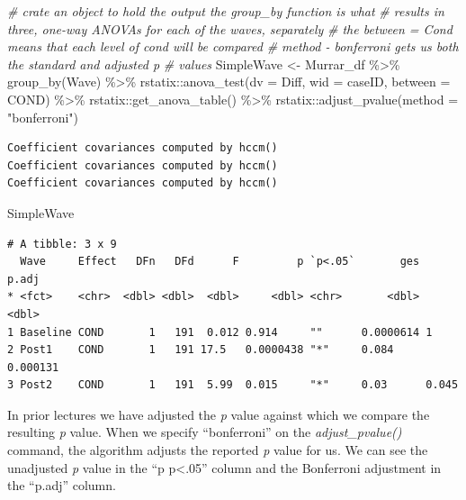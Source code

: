 \documentclass[
  11pt,
]{book}
\newenvironment{Shaded}{\begin{snugshade}}{\end{snugshade}}
\newcommand{\AttributeTok}[1]{\textcolor[rgb]{0.77,0.63,0.00}{#1}}
\newcommand{\CommentTok}[1]{\textcolor[rgb]{0.56,0.35,0.01}{\textit{#1}}}
\newcommand{\FunctionTok}[1]{\textcolor[rgb]{0.00,0.00,0.00}{#1}}
\newcommand{\NormalTok}[1]{#1}
\newcommand{\OtherTok}[1]{\textcolor[rgb]{0.56,0.35,0.01}{#1}}
\newcommand{\SpecialCharTok}[1]{\textcolor[rgb]{0.00,0.00,0.00}{#1}}
\newcommand{\StringTok}[1]{\textcolor[rgb]{0.31,0.60,0.02}{#1}}
\begin{document}
\begin{Shaded}
\begin{Highlighting}[]
\CommentTok{\# crate an object to hold the output the group\_by function is what}
\CommentTok{\# results in three, one{-}way ANOVAs for each of the waves, separately}
\CommentTok{\# the between = Cond means that each level of cond will be compared}
\CommentTok{\# method {-} \textquotesingle{}bonferroni\textquotesingle{} gets us both the standard and adjusted p}
\CommentTok{\# values}
\NormalTok{SimpleWave }\OtherTok{\textless{}{-}}\NormalTok{ Murrar\_df }\SpecialCharTok{\%\textgreater{}\%}
    \FunctionTok{group\_by}\NormalTok{(Wave) }\SpecialCharTok{\%\textgreater{}\%}
\NormalTok{    rstatix}\SpecialCharTok{::}\FunctionTok{anova\_test}\NormalTok{(}\AttributeTok{dv =}\NormalTok{ Diff, }\AttributeTok{wid =}\NormalTok{ caseID, }\AttributeTok{between =}\NormalTok{ COND) }\SpecialCharTok{\%\textgreater{}\%}
\NormalTok{    rstatix}\SpecialCharTok{::}\FunctionTok{get\_anova\_table}\NormalTok{() }\SpecialCharTok{\%\textgreater{}\%}
\NormalTok{    rstatix}\SpecialCharTok{::}\FunctionTok{adjust\_pvalue}\NormalTok{(}\AttributeTok{method =} \StringTok{"bonferroni"}\NormalTok{)}
\end{Highlighting}
\end{Shaded}

\begin{verbatim}
Coefficient covariances computed by hccm()
Coefficient covariances computed by hccm()
Coefficient covariances computed by hccm()
\end{verbatim}

\begin{Shaded}
\begin{Highlighting}[]
\NormalTok{SimpleWave}
\end{Highlighting}
\end{Shaded}

\begin{verbatim}
# A tibble: 3 x 9
  Wave     Effect   DFn   DFd      F         p `p<.05`       ges    p.adj
* <fct>    <chr>  <dbl> <dbl>  <dbl>     <dbl> <chr>       <dbl>    <dbl>
1 Baseline COND       1   191  0.012 0.914     ""      0.0000614 1       
2 Post1    COND       1   191 17.5   0.0000438 "*"     0.084     0.000131
3 Post2    COND       1   191  5.99  0.015     "*"     0.03      0.045   
\end{verbatim}

In prior lectures we have adjusted the \emph{p} value against which we compare the resulting \emph{p} value. When we specify ``bonferroni'' on the \emph{adjust\_pvalue()} command, the algorithm adjusts the reported \emph{p} value for us. We can see the unadjusted \emph{p} value in the ``p p\textless.05'' column and the Bonferroni adjustment in the ``p.adj'' column.
\end{document}
